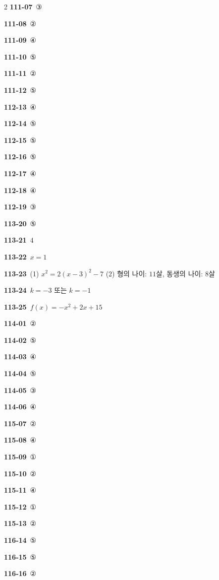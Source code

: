 \documentclass[10pt,a4paper]{article}
\begin{document}
\begin{multicols}{2}
\noindent\textbf{111-07}\ ③\par
\noindent\textbf{111-08}\ ②\par
\noindent\textbf{111-09}\ ④\par
\noindent\textbf{111-10}\ ⑤\par
\noindent\textbf{111-11}\ ②\par
\noindent\textbf{111-12}\ ⑤\par
\noindent\textbf{112-13}\ ④\par
\noindent\textbf{112-14}\ ⑤\par
\noindent\textbf{112-15}\ ⑤\par
\noindent\textbf{112-16}\ ⑤\par
\noindent\textbf{112-17}\ ④\par
\noindent\textbf{112-18}\ ④\par
\noindent\textbf{112-19}\ ③\par
\noindent\textbf{113-20}\ ⑤\par
\noindent\textbf{113-21}\ $4$\par
\noindent\textbf{113-22}\ $x=1$\par
\noindent\textbf{113-23}\ (1) $x^2=2(x-3)^2-7$ (2) 형의 나이: $11$살, 동생의 나이: $8$살\par
\noindent\textbf{113-24}\ $k=-3$ 또는 $k=-1$\par
\noindent\textbf{113-25}\ $f(x)=-x^2+2x+15$\par
\noindent\textbf{114-01}\ ②\par
\noindent\textbf{114-02}\ ⑤\par
\noindent\textbf{114-03}\ ④\par
\noindent\textbf{114-04}\ ⑤\par
\noindent\textbf{114-05}\ ③\par
\noindent\textbf{114-06}\ ④\par
\noindent\textbf{115-07}\ ②\par
\noindent\textbf{115-08}\ ④\par
\noindent\textbf{115-09}\ ①\par
\noindent\textbf{115-10}\ ②\par
\noindent\textbf{115-11}\ ④\par
\noindent\textbf{115-12}\ ①\par
\noindent\textbf{115-13}\ ②\par
\noindent\textbf{116-14}\ ⑤\par
\noindent\textbf{116-15}\ ⑤\par
\noindent\textbf{116-16}\ ②\par

\end{multicols}
\end{document}
